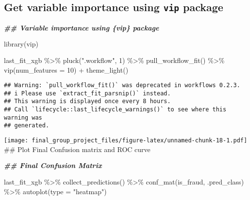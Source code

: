 \documentclass[
]{article}
\newenvironment{Shaded}{\begin{snugshade}}{\end{snugshade}}
\newcommand{\AttributeTok}[1]{\textcolor[rgb]{0.77,0.63,0.00}{#1}}
\newcommand{\DecValTok}[1]{\textcolor[rgb]{0.00,0.00,0.81}{#1}}
\newcommand{\DocumentationTok}[1]{\textcolor[rgb]{0.56,0.35,0.01}{\textbf{\textit{#1}}}}
\newcommand{\FunctionTok}[1]{\textcolor[rgb]{0.00,0.00,0.00}{#1}}
\newcommand{\NormalTok}[1]{#1}
\newcommand{\SpecialCharTok}[1]{\textcolor[rgb]{0.00,0.00,0.00}{#1}}
\newcommand{\StringTok}[1]{\textcolor[rgb]{0.31,0.60,0.02}{#1}}
\begin{document}
\hypertarget{get-variable-importance-using-vip-package}{%
\subsection{\texorpdfstring{Get variable importance using \texttt{vip}
package}{Get variable importance using vip package}}\label{get-variable-importance-using-vip-package}}

\begin{Shaded}
\begin{Highlighting}[]
\DocumentationTok{\#\# Variable importance using \textasciigrave{}\{vip\}\textasciigrave{} package}

\FunctionTok{library}\NormalTok{(vip)}

\NormalTok{last\_fit\_xgb }\SpecialCharTok{\%\textgreater{}\%} 
  \FunctionTok{pluck}\NormalTok{(}\StringTok{".workflow"}\NormalTok{, }\DecValTok{1}\NormalTok{) }\SpecialCharTok{\%\textgreater{}\%}   
  \FunctionTok{pull\_workflow\_fit}\NormalTok{() }\SpecialCharTok{\%\textgreater{}\%} 
  \FunctionTok{vip}\NormalTok{(}\AttributeTok{num\_features =} \DecValTok{10}\NormalTok{) }\SpecialCharTok{+}
  \FunctionTok{theme\_light}\NormalTok{()}
\end{Highlighting}
\end{Shaded}

\begin{verbatim}
## Warning: `pull_workflow_fit()` was deprecated in workflows 0.2.3.
## i Please use `extract_fit_parsnip()` instead.
## This warning is displayed once every 8 hours.
## Call `lifecycle::last_lifecycle_warnings()` to see where this warning was
## generated.
\end{verbatim}

\texttt{[image: final\_group\_project\_files/figure-latex/unnamed-chunk-18-1.pdf]}
\#\# Plot Final Confusion matrix and ROC curve

\begin{Shaded}
\begin{Highlighting}[]
\DocumentationTok{\#\# Final Confusion Matrix}

\NormalTok{last\_fit\_xgb }\SpecialCharTok{\%\textgreater{}\%}
  \FunctionTok{collect\_predictions}\NormalTok{() }\SpecialCharTok{\%\textgreater{}\%} 
  \FunctionTok{conf\_mat}\NormalTok{(is\_fraud, .pred\_class) }\SpecialCharTok{\%\textgreater{}\%} 
  \FunctionTok{autoplot}\NormalTok{(}\AttributeTok{type =} \StringTok{"heatmap"}\NormalTok{)}
\end{Highlighting}
\end{Shaded}
\end{document}
